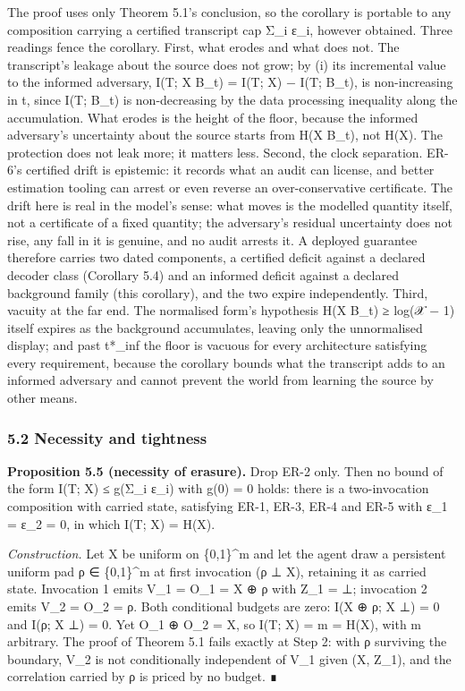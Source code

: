 \documentclass[
  11pt,
]{article}
\begin{document}
The proof uses only Theorem 5.1's conclusion, so the corollary is
portable to any composition carrying a certified transcript cap Σ\_i
ε\_i, however obtained. Three readings fence the corollary. First, what
erodes and what does not. The transcript's leakage about the source does
not grow; by (i) its incremental value to the informed adversary, I(T; X
\textbar{} B\_t) = I(T; X) − I(T; B\_t), is non-increasing in t, since
I(T; B\_t) is non-decreasing by the data processing inequality along the
accumulation. What erodes is the height of the floor, because the
informed adversary's uncertainty about the source starts from H(X
\textbar{} B\_t), not H(X). The protection does not leak more; it
matters less. Second, the clock separation. ER-6's certified drift is
epistemic: it records what an audit can license, and better estimation
tooling can arrest or even reverse an over-conservative certificate. The
drift here is real in the model's sense: what moves is the modelled
quantity itself, not a certificate of a fixed quantity; the adversary's
residual uncertainty does not rise, any fall in it is genuine, and no
audit arrests it. A deployed guarantee therefore carries two dated
components, a certified deficit against a declared decoder class
(Corollary 5.4) and an informed deficit against a declared background
family (this corollary), and the two expire independently. Third,
vacuity at the far end. The normalised form's hypothesis H(X \textbar{}
B\_t) ≥ log(\textbar 𝒳\textbar{} − 1) itself expires as the background
accumulates, leaving only the unnormalised display; and past t*\_inf the
floor is vacuous for every architecture satisfying every requirement,
because the corollary bounds what the transcript adds to an informed
adversary and cannot prevent the world from learning the source by other
means.

\subsubsection{5.2 Necessity and
tightness}\label{necessity-and-tightness}

\textbf{Proposition 5.5 (necessity of erasure).} Drop ER-2 only. Then no
bound of the form I(T; X) ≤ g(Σ\_i ε\_i) with g(0) = 0 holds: there is a
two-invocation composition with carried state, satisfying ER-1, ER-3,
ER-4 and ER-5 with ε\_1 = ε\_2 = 0, in which I(T; X) = H(X).

\emph{Construction.} Let X be uniform on \{0,1\}\^{}m and let the agent
draw a persistent uniform pad ρ ∈ \{0,1\}\^{}m at first invocation (ρ ⊥
X), retaining it as carried state. Invocation 1 emits V\_1 = O\_1 = X ⊕
ρ with Z\_1 = ⊥; invocation 2 emits V\_2 = O\_2 = ρ. Both conditional
budgets are zero: I(X ⊕ ρ; X \textbar{} ⊥) = 0 and I(ρ; X \textbar{} ⊥)
= 0. Yet O\_1 ⊕ O\_2 = X, so I(T; X) = m = H(X), with m arbitrary. The
proof of Theorem 5.1 fails exactly at Step 2: with ρ surviving the
boundary, V\_2 is not conditionally independent of V\_1 given (X, Z\_1),
and the correlation carried by ρ is priced by no budget. ∎
\end{document}
